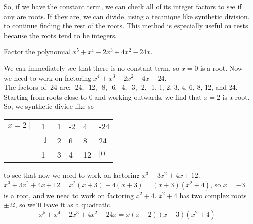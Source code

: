 \noindent
So, if we have the constant term, we can check all of its integer factors to see if any are roots. If they are, we can divide, using a technique like synthetic division, to continue finding the rest of the roots. This method is especially useful on tests because the roots tend to be integers.

\begin{example}
Factor the polynomial $x^5 + x^4 -2x^3 + 4x^2 -24x$.	
\end{example}
\noindent
We can immediately see that there is no constant term, so $x=0$ is a root. Now we need to work on factoring $x^4 + x^3 -2x^2 + 4x - 24$.\\
The factors of -24 are: -24, -12, -8, -6, -4, -3, -2, -1, 1, 2, 3, 4, 6, 8, 12, and 24. Starting from roots close to 0 and working outwards, we find that $x=2$ is a root. So, we synthetic divide like so
\begin{table}[H]
	\centering
	\begin{tabular}{llllll}
		$x=2 \mid$ & 1            & 1 & -2 & 4  & -24 \\
		& $\downarrow$ & 2 & 6  & 8  & 24  \\ \hline
		& 1            & 3 & 4  & 12 & $\mid 0$  
	\end{tabular}
\end{table}
\noindent
to see that now we need to work on factoring $x^3+3x^2+4x+12$.
$x^3+3x^2+4x+12 = x^2(x+3)+4(x+3) = (x+3)(x^2+4)$, so $x=-3$ is a root, and we need to work on factoring $x^2+4$.
$x^2+4$ has two complex roots $\pm 2i$, so we'll leave it as a quadratic.
\begin{equation*}	
	x^5 + x^4 -2x^3 + 4x^2 -24x = x(x-2)(x-3)(x^2+4)
\end{equation*}